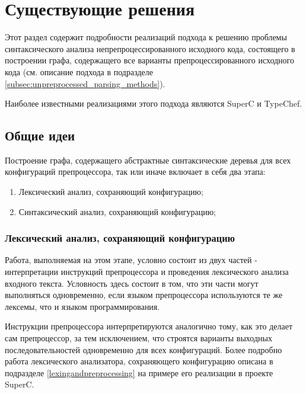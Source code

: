 \clearpage

\section{Существующие решения}

Этот раздел содержит подробности реализаций подхода к решению проблемы синтаксического анализа непрепроцессированного исходного кода, состоящего в построении графа, содержащего все варианты препроцессированного исходного кода (см. описание подхода в подразделе \ref{subsec:unpreprocessed_parsing_methods}).

Наиболее известными реализациями этого подхода являются SuperC\cite{superc} и TypeChef\cite{typechef}.

\subsection{Общие идеи}
\label{subsec:commonideas}

Построение графа, содержащего абстрактные синтаксические деревья для всех конфигураций препроцессора, так или иначе включает в себя два этапа:

\begin{enumerate}

\item Лексический анализ, сохраняющий конфигурацию;
\item Синтаксический анализ, сохраняющий конфигурацию;

\end{enumerate} 

\subsubsection{Лексический анализ, сохраняющий конфигурацию}

Работа, выполняемая на этом этапе, условно состоит из двух частей - интерпретации инструкций препроцессора и проведения лексического анализа входного текста. Условность здесь состоит в том, что эти части могут выполняться одновременно, если языком препроцессора используются те же лексемы, что и языком программирования.

Инструкции препроцессора интерпретируются аналогично тому, как это делает сам препроцессор, за тем исключением, что строятся варианты выходных последовательностей одновременно для всех конфигураций. Более подробно работа лексического анализатора, сохраняющего конфигурацию описана в подразделе \ref{lexingandpreprocessing} на примере его реализации в проекте SuperC.

